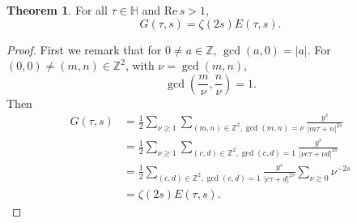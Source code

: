 \documentclass{article}
\def\Re{\ensuremath{\mathrm{Re}}\,}
\theoremstyle{definition}
\newtheorem{theorem}{Theorem}
\theoremstyle{definition}
\begin{document}
\begin{theorem}
For all $\tau \in \mathbb{H}$ and $\Re s>1$,
\[
G(\tau,s)=\zeta(2s) E(\tau,s).
\]
\end{theorem}
\begin{proof}
First we remark that for $0 \neq a \in \mathbb{Z}$, $\gcd(a,0)=|a|$. For $(0,0) \neq (m,n) \in \mathbb{Z}^2$, with
$\nu=\gcd(m,n)$,
\[
\gcd\left(\frac{m}{\nu},\frac{n}{\nu}\right)=1.
\]
Then
\begin{align*}
G(\tau,s)&=\frac{1}{2}  \sum_{\nu \geq 1}  \sum_{(m,n) \in \mathbb{Z}^2, \gcd(m,n)=\nu}
\frac{y^s}{|m\tau+ n|^{2s}}\\
&=\frac{1}{2}  \sum_{\nu \geq 1}  \sum_{(c,d) \in \mathbb{Z}^2, \gcd(c,d)=1}
\frac{y^s}{|\nu c\tau+ \nu d|^{2s}}\\
&=\frac{1}{2}  \sum_{(c,d) \in \mathbb{Z}^2, \gcd(c,d)=1} \frac{y^s}{|c\tau+d|^{2s}}  \sum_{\nu \geq 0} \nu^{-2s}\\
&=\zeta(2s) E(\tau,s).
\end{align*}
\end{proof}
\end{document}
